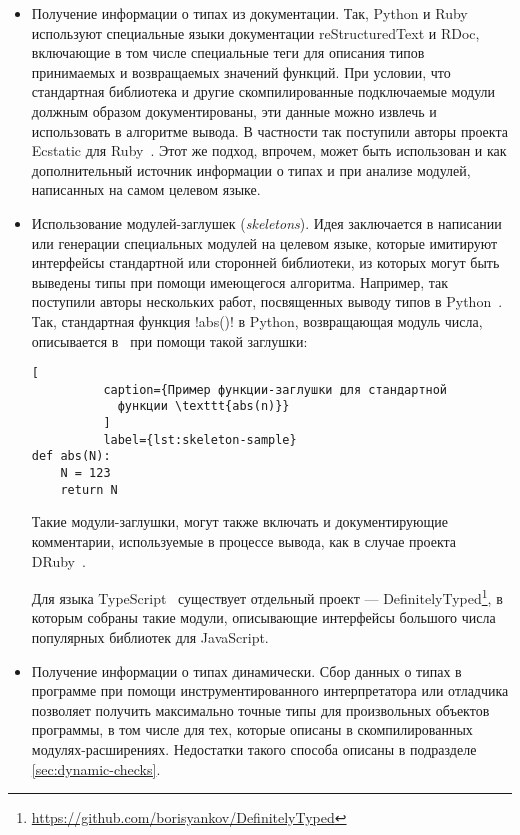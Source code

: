 \begin{itemize}
    \item Получение информации о типах из документации.  Так, Python и Ruby
        используют специальные языки документации reStructuredText и RDoc,
        включающие в том числе специальные теги для описания типов принимаемых и
        возвращаемых значений функций. При условии, что стандартная библиотека и
        другие скомпилированные подключаемые модули должным образом
        документированы, эти данные можно извлечь и использовать в алгоритме
        вывода.  В частности так поступили авторы проекта Ecstatic для
        Ruby~\cite{Madsen2007}.  Этот же подход, впрочем, может быть использован
        и как дополнительный источник информации о типах и при анализе модулей,
        написанных на самом целевом языке.

    \item Использование модулей-заглушек (\emph{skeletons}). Идея заключается в
        написании или генерации специальных модулей на целевом языке, которые
        имитируют интерфейсы стандартной или сторонней библиотеки,
        из которых могут быть выведены типы при помощи имеющегося алгоритма.
        Например, так поступили авторы нескольких работ, посвященных
        выводу типов в Python~\cite{Aycock2000,Salib2004}.  Так,
        стандартная функция !abs()! в Python, возвращающая модуль числа,
        описывается в~\cite{Aycock2000} при помощи такой заглушки:

        \begin{lstlisting}[
          caption={Пример функции-заглушки для стандартной
            функции \texttt{abs(n)}}
          ]
          label={lst:skeleton-sample}
def abs(N):
    N = 123
    return N
        \end{lstlisting}

        Такие модули-заглушки, могут также включать и документирующие
        комментарии, используемые в процессе вывода, как в случае
        проекта DRuby~\cite{Furr2009}.
        
        Для языка TypeScript~\cite{TypeScript} существует отдельный проект ---
        DefinitelyTyped\footnote{\url{https://github.com/borisyankov/DefinitelyTyped}},
        в которым собраны такие модули, описывающие интерфейсы большого числа
        популярных библиотек для JavaScript.

      \item Получение информации о типах динамически. Сбор данных о типах в
          программе при помощи инструментированного интерпретатора или отладчика
          позволяет получить максимально точные типы для произвольных объектов
          программы, в том числе для тех, которые описаны в скомпилированных
          модулях-расширениях. Недостатки такого способа описаны в подразделе
          \ref{sec:dynamic-checks}.

\end{itemize}

